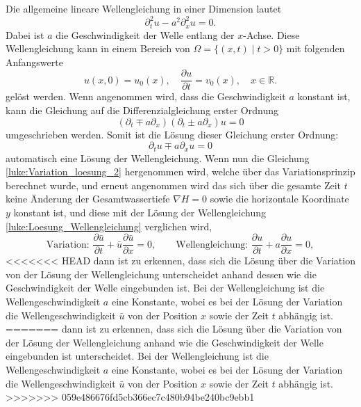 Die allgemeine lineare Wellengleichung in einer Dimension lautet
\[
\partial_t^2 u - a^2 \partial_x^2 u  = 0.
\]
Dabei ist $a$ die Geschwindigkeit der Welle entlang der $x$-Achse.
Diese Wellengleichung kann in einem Bereich von $\Omega = \{(x,t)\mid t >0\}$ mit folgenden Anfangswerte
\[
u(x,0) = u_0(x),\quad \frac{\partial u}{\partial t} = v_0(x),\quad x \in \mathbb{R}.
\]
gelöst werden.
Wenn angenommen wird, dass die Geschwindigkeit $a$ konstant ist, kann die Gleichung auf die Differenzialgleichung erster Ordnung
\[
(\partial_t\mp a\partial_x)(\partial_t\pm a\partial_x) u  = 0
\]
 umgeschrieben werden.
Somit ist die Lösung dieser Gleichung erster Ordnung:
\begin{equation}
	\partial_t u \mp a\partial_x u = 0
	\label{luke:Loesung_Wellengleichung}
\end{equation}
automatisch eine Lösung der Wellengleichung.
Wenn nun die Gleichung \eqref{luke:Variation_loesung_2} hergenommen wird, welche über das Variationsprinzip berechnet wurde, und erneut angenommen wird das sich über die gesamte Zeit $t$ keine Änderung der Gesamtwassertiefe $ \nabla H = 0 $ sowie die horizontale Koordinate $y$ konstant ist, und diese mit der Lösung der Wellengleichung \eqref{luke:Loesung_Wellengleichung} verglichen wird,
\[
\text{Variation: }\frac{\partial \bar{u}}{\partial t} + \bar{u} \frac{\partial \bar{u}}{\partial x} = 0,
\qquad
\text{Wellengleichung: }\frac{\partial u}{\partial t} + a \frac{\partial u}{\partial x} = 0,
\]
<<<<<<< HEAD
dann ist zu erkennen, dass sich die Lösung über die Variation von der Lösung der Wellengleichung unterscheidet anhand dessen wie die Geschwindigkeit der Welle eingebunden ist.
Bei der Wellengleichung ist die Wellengeschwindigkeit $a$ eine Konstante, wobei es bei der Lösung der Variation die Wellengeschwindigkeit $\bar{u}$ von der Position $x$ sowie der Zeit $t$ abhängig ist.
=======
dann ist zu erkennen, dass sich die Lösung über die Variation von der Lösung der Wellengleichung anhand wie die Geschwindigkeit der Welle eingebunden ist unterscheidet.
Bei der Wellengleichung ist die Wellengeschwindigkeit $a$ eine Konstante, wobei es bei der Lösung der Variation die Wellengeschwindigkeit $\bar{u}$ von der Position $x$ sowie der Zeit $t$ abhängig ist.
>>>>>>> 059e486676fd5cb366ec7c480b94be240bc9ebb1
